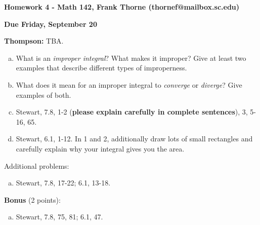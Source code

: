 \documentclass[12pt]{article}
\begin{document}
\setlength{\topmargin}{-2mm}





\begin{center}{\bf Homework 4 - Math 142, Frank Thorne (thornef@mailbox.sc.edu)}
\end{center}
\begin{center}
{\bf Due Friday, September 20}
\end{center}
{\bf Thompson:} TBA.
\begin{enumerate}[(a)]

\item
What is an {\itshape improper integral}? What makes it improper? Give at least two 
examples that describe different types of improperness.
\item
What does it mean for an improper integral to {\itshape converge} or {\itshape diverge}?
Give examples of both.
\item
Stewart, 7.8, 1-2 ({\bf please explain carefully in complete sentences}), 3, 5-16, 65.
\item
Stewart, 6.1, 1-12. In 1 and 2, additionally draw lots of small rectangles and carefully
explain why your integral gives you the area.
\end{enumerate}

Additional problems:

\begin{enumerate}[(a)]
\item
Stewart, 7.8, 17-22; 6.1, 13-18.
\end{enumerate}
{\bf Bonus} (2 points):
\begin{enumerate}[(a)]
\item
Stewart, 7.8, 75, 81; 6.1, 47.
\end{enumerate}
\end{document}
